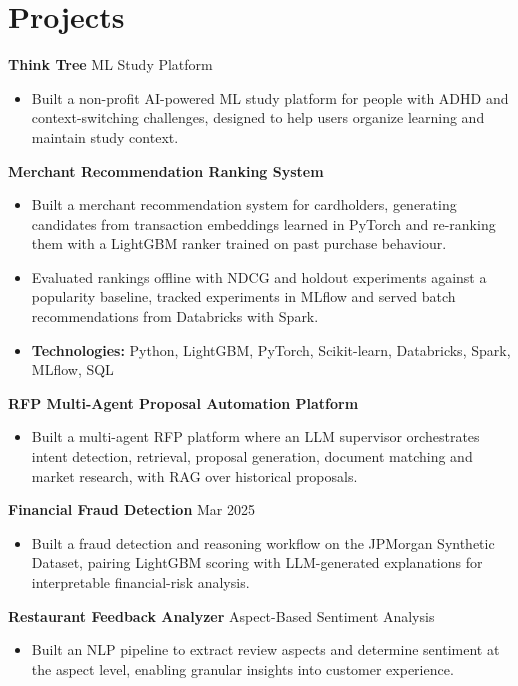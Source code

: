 \documentclass[10pt,a4paper]{article}
\begin{document}
\section{Projects}
\textbf{Think Tree} \textbar{} ML Study Platform\par
\begin{itemize}
  \item Built a non-profit AI-powered ML study platform for people with ADHD and context-switching challenges, designed to help users organize learning and maintain study context.
\end{itemize}
\textbf{Merchant Recommendation Ranking System}\par
\begin{itemize}
  \item Built a merchant recommendation system for cardholders, generating candidates from transaction embeddings learned in PyTorch and re-ranking them with a LightGBM ranker trained on past purchase behaviour.
  \item Evaluated rankings offline with NDCG and holdout experiments against a popularity baseline, tracked experiments in MLflow and served batch recommendations from Databricks with Spark.
  \item \textbf{Technologies:} Python, LightGBM, PyTorch, Scikit-learn, Databricks, Spark, MLflow, SQL
\end{itemize}
\textbf{RFP Multi-Agent Proposal Automation Platform}\par
\begin{itemize}
  \item Built a multi-agent RFP platform where an LLM supervisor orchestrates intent detection, retrieval, proposal generation, document matching and market research, with RAG over historical proposals.
\end{itemize}
\textbf{Financial Fraud Detection} \textbar{} Mar 2025\par
\begin{itemize}
  \item Built a fraud detection and reasoning workflow on the JPMorgan Synthetic Dataset, pairing LightGBM scoring with LLM-generated explanations for interpretable financial-risk analysis.
\end{itemize}
\textbf{Restaurant Feedback Analyzer} \textbar{} Aspect-Based Sentiment Analysis\par
\begin{itemize}
  \item Built an NLP pipeline to extract review aspects and determine sentiment at the aspect level, enabling granular insights into customer experience.
\end{itemize}
\end{document}
